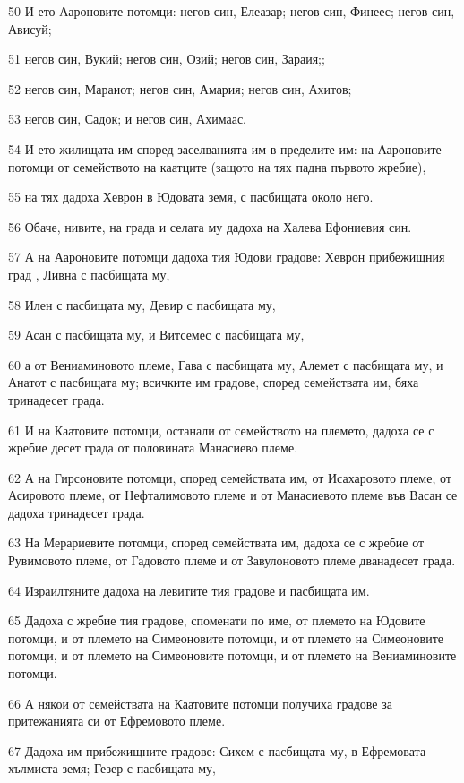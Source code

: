 \par 50 И ето Аароновите потомци: негов син, Елеазар; негов син, Финеес; негов син, Ависуй;
\par 51 негов син, Вукий; негов син, Озий; негов син, Зараия;;
\par 52 негов син, Мараиот; негов син, Амария; негов син, Ахитов;
\par 53 негов син, Садок; и негов син, Ахимаас.
\par 54 И ето жилищата им според заселванията им в пределите им: на Аароновите потомци от семейството на каатците (защото на тях падна първото жребие),
\par 55 на тях дадоха Хеврон в Юдовата земя, с пасбищата около него.
\par 56 Обаче, нивите, на града и селата му дадоха на Халева Ефониевия син.
\par 57 А на Аароновите потомци дадоха тия Юдови градове: Хеврон прибежищния град , Ливна с пасбищата му,
\par 58 Илен с пасбищата му, Девир с пасбищата му,
\par 59 Асан с пасбищата му, и Витсемес с пасбищата му,
\par 60 а от Вениаминовото племе, Гава с пасбищата му, Алемет с пасбищата му, и Анатот с пасбищата му; всичките им градове, според семействата им, бяха тринадесет града.
\par 61 И на Каатовите потомци, останали от семейството на племето, дадоха се с жребие десет града от половината Манасиево племе.
\par 62 А на Гирсоновите потомци, според семействата им, от Исахаровото племе, от Асировото племе, от Нефталимовото племе и от Манасиевото племе във Васан се дадоха тринадесет града.
\par 63 На Мерариевите потомци, според семействата им, дадоха се с жребие от Рувимовото племе, от Гадовото племе и от Завулоновото племе дванадесет града.
\par 64 Израилтяните дадоха на левитите тия градове и пасбищата им.
\par 65 Дадоха с жребие тия градове, споменати по име, от племето на Юдовите потомци, и от племето на Симеоновите потомци, и от племето на Симеоновите потомци, и от племето на Симеоновите потомци, и от племето на Вениаминовите потомци.
\par 66 А някои от семействата на Каатовите потомци получиха градове за притежанията си от Ефремовото племе.
\par 67 Дадоха им прибежищните градове: Сихем с пасбищата му, в Ефремовата хълмиста земя; Гезер с пасбищата му,
